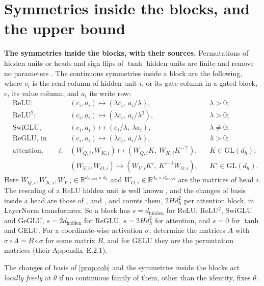\documentclass[10pt]{article}
\theoremstyle{definition}
\theoremstyle{remark}
\newcommand{\R}{\mathbb{R}}
\newcommand{\dm}{d_{\mathrm{model}}}
\newcommand{\dhid}{d_{\mathrm{hidden}}}
\newcommand{\GL}{\mathrm{GL}}
\newcommand{\para}[1]{\smallskip\noindent\textbf{#1}\hspace{0.5em}}
\begin{document}
\section{Symmetries inside the blocks, and the upper bound}\label{app:prf-count}

\para{The symmetries inside the blocks, with their sources.} Permutations of hidden units or heads and sign flips of $\tanh$ hidden units are finite and remove no parameters \citep{hechtnielsen1989theory,sussmann1992,fefferman1994}. The continuous symmetries inside a block are the following, where $c_i$ is the read column of hidden unit $i$, or its gate column in a gated block, $e_i$ its value column, and $a_i$ its write row:
\begin{align*}
&\text{ReLU:} && (c_i, a_i) \mapsto (\lambda c_i,\ a_i/\lambda), && \lambda > 0;\\
&\text{ReLU}^2\text{:} && (c_i, a_i) \mapsto (\lambda c_i,\ a_i/\lambda^2), && \lambda > 0;\\
&\text{SwiGLU, GeGLU, ReGLU:} && (e_i, a_i) \mapsto (e_i/\lambda,\ \lambda a_i), && \lambda \neq 0;\\
&\text{ReGLU, in addition:} && (c_i, a_i) \mapsto (\lambda c_i,\ a_i/\lambda), && \lambda > 0;\\
&\text{attention, head } i\text{:} && (W_{Q,i}, W_{K,i}) \mapsto (W_{Q,i}K,\ W_{K,i}K^{-\top}), && K \in \GL(d_h);\\
& && (W_{V,i}, W_{O,i}) \mapsto (W_{V,i}K',\ K'^{-1}W_{O,i}), && K' \in \GL(d_h).
\end{align*}
Here $W_{Q,i}, W_{K,i}, W_{V,i} \in \R^{\dm\times d_h}$ and $W_{O,i} \in \R^{d_h\times\dm}$ are the matrices of head $i$. The rescaling of a ReLU hidden unit is well known \citep{rolnick2020reverse,petzka2020symmetries,godfrey2022symmetries}, and the changes of basis inside a head are those of \citet{elhage2021circuits}, \citet{tran2025equivariant} and \citet{theus2025glmc}, and \citet[Eq.~17]{vannierop2024gauge} counts them, $2Hd_h^2$ per attention block, in LayerNorm transformers. So a block has $s = \dhid$ for ReLU, ReLU$^2$, SwiGLU and GeGLU, $s = 2\dhid$ for ReGLU, $s = 2Hd_h^2$ for attention, and $s = 0$ for $\tanh$ and GELU. For a coordinate-wise activation $\sigma$, \citet[Theorem~E.14]{godfrey2022symmetries} determine the matrices $A$ with $\sigma\circ A = B\circ\sigma$ for some matrix $B$, and for GELU they are the permutation matrices (their Appendix~E.2.1).

The changes of basis of \cref{prop:cob} and the symmetries inside the blocks act \emph{locally freely} at $\theta$ if no continuous family of them, other than the identity, fixes $\theta$.
\end{document}
